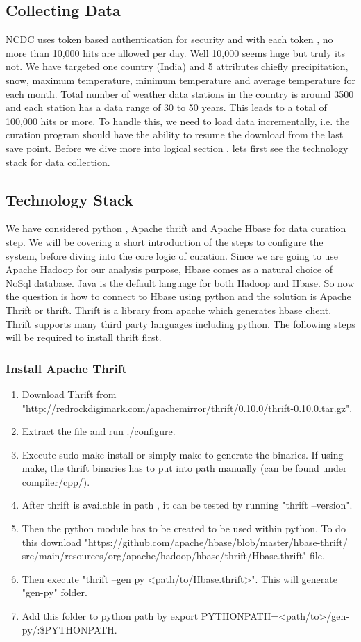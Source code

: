 \documentclass[9pt,twocolumn,twoside]{../../styles/osajnl}
\begin{document}
\subsection{Collecting Data}
NCDC uses token based authentication for security and with each token , no more than 10,000 hits are allowed per day. Well 10,000 seems huge but truly its not. We have targeted one country (India) and 5 attributes chiefly precipitation, snow, maximum temperature, minimum temperature and average temperature for each month. Total number of weather data stations in the country is around 3500 and each station has a data range of 30 to 50 years. This leads to a total of 100,000 hits or more. To handle this, we need to load data incrementally, i.e. the curation program should have the ability to resume the download from the last save point. Before we dive more into logical section , lets first see the technology stack for data collection.

\subsection{Technology Stack}
We have considered python , Apache thrift and Apache Hbase for data curation step. We will be covering a short introduction of the steps to configure the system, before diving into the core logic of curation. Since we are going to use Apache Hadoop for our analysis purpose, Hbase comes as a natural choice of NoSql database. Java is the default language for both Hadoop and Hbase. So now the question is how to connect to Hbase using python and the solution is Apache Thrift or thrift. Thrift is a library from apache which generates hbase client. Thrift supports many third party languages including python. The following steps will be required to install thrift first.
\subsubsection{Install Apache Thrift \cite{thrift-python-install}}

\begin{enumerate}
\item Download Thrift from 
"http://redrockdigimark.com/apachemirror/thrift/0.10.0/thrift-0.10.0.tar.gz".
\item Extract the file and run ./configure.
\item Execute sudo make install or simply make to generate the binaries.
 If using make, the thrift binaries has to put into path manually 
 (can be found under compiler/cpp/).
\item After thrift is available in path , it can be tested by 
running "thrift --version".
\item Then the python module has to be created to be used within python.
 To do this download "https://github.com/apache/hbase/blob/master/hbase-thrift/
 src/main/resources/org/apache/hadoop/hbase/thrift/Hbase.thrift" file.
\item Then execute "thrift --gen py <path/to/Hbase.thrift>". This will 
generate "gen-py" folder.
\item Add this folder to python path by export 
PYTHONPATH=<path/to>/gen-py/:\$PYTHONPATH.
\end{enumerate}
\end{document}
